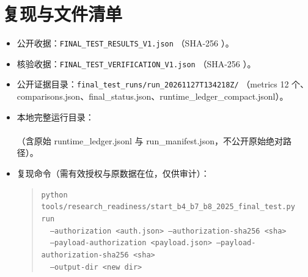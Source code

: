 \documentclass[UTF8,a4paper,fontset=windows,11pt]{ctexart}
\begin{document}
\section{复现与文件清单}

\begin{itemize}
\item 公开收据：\texttt{FINAL\_TEST\_RESULTS\_V1.json}
（SHA-256 \texttt{}）。
\item 核验收据：\texttt{FINAL\_TEST\_VERIFICATION\_V1.json}
（SHA-256 \texttt{}）。
\item 公开证据目录：\texttt{final\_test\_runs/run\_20261127T134218Z/}
（metrics 12 个、comparisons.json、final\_status.json、runtime\_ledger\_compact.jsonl）。
\item 本地完整运行目录：\\
\texttt{}\\
（含原始 runtime\_ledger.jsonl 与 run\_manifest.json，不公开原始绝对路径）。
\item 复现命令（需有效授权与原数据在位，仅供审计）：
\begin{quote}\small
\texttt{python tools/research\_readiness/start\_b4\_b7\_b8\_2025\_final\_test.py run}\\
\texttt{\ \ --authorization <auth.json> --authorization-sha256 <sha>}\\
\texttt{\ \ --payload-authorization <payload.json> --payload-authorization-sha256 <sha>}\\
\texttt{\ \ --output-dir <new dir>}
\end{quote}
\end{itemize}
\end{document}
